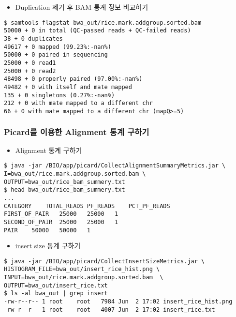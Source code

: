 \documentclass{article}
\begin{document}
\begin{itemize}
\item
  \begin{itemize}
  Duplication 제거 후 BAM 통계 정보 비교하기  
  \end{itemize}
\end{itemize}
\begin{lstlisting}[frame=single,style=Bash,xleftmargin=1.4cm,xrightmargin=1.4cm]
$ samtools flagstat bwa_out/rice.mark.addgroup.sorted.bam 
50000 + 0 in total (QC-passed reads + QC-failed reads)
38 + 0 duplicates
49617 + 0 mapped (99.23%:-nan%)
50000 + 0 paired in sequencing
25000 + 0 read1
25000 + 0 read2
48498 + 0 properly paired (97.00%:-nan%)
49482 + 0 with itself and mate mapped
135 + 0 singletons (0.27%:-nan%)
212 + 0 with mate mapped to a different chr
66 + 0 with mate mapped to a different chr (mapQ>=5)
\end{lstlisting}

\subsubsection{Picard를 이용한 Alignment 통계 구하기}

\begin{itemize}
\item
  \begin{itemize}
  Alignment 통계 구하기  
  \end{itemize}
\end{itemize}
\begin{lstlisting}[frame=single,style=Bash,xleftmargin=1.4cm,xrightmargin=1.4cm]
$ java -jar /BIO/app/picard/CollectAlignmentSummaryMetrics.jar \
I=bwa_out/rice.mark.addgroup.sorted.bam \
OUTPUT=bwa_out/rice_bam_summery.txt
$ head bwa_out/rice_bam_summery.txt 
...
CATEGORY	TOTAL_READS	PF_READS	PCT_PF_READS	
FIRST_OF_PAIR	25000	25000	1			
SECOND_OF_PAIR	25000	25000	1			
PAIR	50000	50000	1	
\end{lstlisting}

\begin{itemize}
\item
  \begin{itemize}
  insert size 통계 구하기  
  \end{itemize}
\end{itemize}
\begin{lstlisting}[frame=single,style=Bash,xleftmargin=1.4cm,xrightmargin=1.4cm]
$ java -jar /BIO/app/picard/CollectInsertSizeMetrics.jar \
HISTOGRAM_FILE=bwa_out/insert_rice_hist.png \
INPUT=bwa_out/rice.mark.addgroup.sorted.bam  \
OUTPUT=bwa_out/insert_rice.txt
$ ls -al bwa_out | grep insert
-rw-r--r-- 1 root    root   7984 Jun  2 17:02 insert_rice_hist.png
-rw-r--r-- 1 root    root   4007 Jun  2 17:02 insert_rice.txt
\end{lstlisting}
\end{document}
